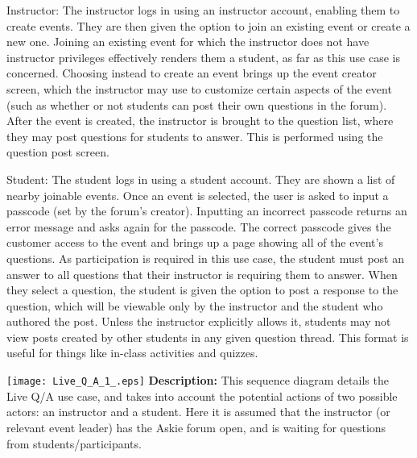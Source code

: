 \documentclass[12pt]{article}
\begin{document}
\begin{flushleft}
Instructor: The instructor logs in using an instructor account, enabling them to create events. They are then given the option to join an existing event or create a new one. Joining an existing event for which the instructor does not have instructor privileges effectively renders them a student, as far as this use case is concerned. Choosing instead to create an event brings up the event creator screen, which the instructor may use to customize certain aspects of the event (such as whether or not students can post their own questions in the forum). After the event is created, the instructor is brought to the question list, where they may post questions for students to answer. This is performed using the question post screen.
\end{flushleft}

\begin{flushleft}
Student: The student logs in using a student account. They are shown a list of nearby joinable events. Once an event is selected, the user is asked to input a passcode (set by the forum's creator). Inputting an incorrect passcode returns an error message and asks again for the passcode. The correct passcode gives the customer access to the event and brings up a page showing all of the event's questions. As participation is required in this use case, the student must post an answer to all questions that their instructor is requiring them to answer. When they select a question, the student is given the option to post a response to the question, which will be viewable only by the instructor and the student who authored the post. Unless the instructor explicitly allows it, students may not view posts created by other students in any given question thread. This format is useful for things like in-class activities and quizzes.
\end{flushleft}


\texttt{[image: Live\_Q\_A\_1\_.eps]}
\textbf{Description:} This sequence diagram details the Live Q/A use case, and takes into account the potential actions of two possible actors: an instructor and a student. Here it is assumed that the instructor (or relevant event leader) has the Askie forum open, and is waiting for questions from students/participants.
\end{document}
